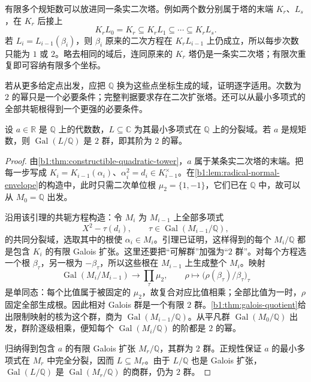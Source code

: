 有限多个规矩数可以放进同一条实二次塔。例如两个数分别属于塔的末端 \(K_r\)、\(L_s\)，在 \(K_r\) 后接上
\[
	K_rL_0=K_r\subseteq K_rL_1\subseteq\cdots\subseteq K_rL_s.
\]
若 \(L_i=L_{i-1}(\beta_i)\)，则 \(\beta_i\) 原来的二次方程在 \(K_rL_{i-1}\) 上仍成立，所以每步次数只能为 \(1\) 或 \(2\)。略去相同的域后，连同原来的 \(K_r\) 塔仍是一条实二次塔；有限次重复即可容纳有限多个坐标。

\ProseParagraphBreak
若从更多给定点出发，应把 \(\mathbb Q\) 换为这些点坐标生成的域，证明逐字适用。次数为 \(2\) 的幂只是一个必要条件；完整判据要求存在二次扩张塔。还可以从最小多项式的全部共轭根得到一个更强的必要条件。

\begin{proposition}\label{b1:prop:constructible-splitting-two-group}
	设 \(a\in\mathbb R\) 是 \(\mathbb Q\) 上的代数数，\(L\subseteq\mathbb C\) 为其最小多项式在 \(\mathbb Q\) 上的分裂域。若 \(a\) 是规矩数，则 \(\operatorname{Gal}(L/\mathbb Q)\) 是 \(2\) 群，即其阶为 \(2\) 的幂。
\end{proposition}
\begin{proof}
	由\cref{b1:thm:constructible-quadratic-tower}，\(a\) 属于某条实二次塔的末端。把每一步写成 \(K_i=K_{i-1}(\alpha_i)\)、\(\alpha_i^2=d_i\in K_{i-1}^\times\)。在\cref{b1:lem:radical-normal-envelope}的构造中，此时只需二次单位根 \(\mu_2=\{1,-1\}\)，它们已在 \(\mathbb Q\) 中，故可以从 \(M_0=\mathbb Q\) 出发。

	沿用该引理的共轭方程构造：令 \(M_i\) 为 \(M_{i-1}\) 上全部多项式
	\[
		X^2-\tau(d_i),\qquad \tau\in\operatorname{Gal}(M_{i-1}/\mathbb Q),
	\]
	的共同分裂域，选取其中的根使 \(\alpha_i\in M_i\)。引理已证明，这样得到的每个 \(M_i/\mathbb Q\) 都是包含 \(K_i\) 的有限 Galois 扩张。这里还要把“可解群”加强为“\(2\) 群”。对每个方程选一个根 \(\beta_\tau\)，另一根为 \(-\beta_\tau\)，所以这些根在 \(M_{i-1}\) 上生成整个 \(M_i\)。映射
	\[
		\operatorname{Gal}(M_i/M_{i-1})\longrightarrow\prod_\tau\mu_2, \qquad \rho\longmapsto \bigl(\rho(\beta_\tau)/\beta_\tau\bigr)_\tau
	\]
	是单同态：每个比值属于被固定的 \(\mu_2\)，故复合对应比值相乘；全部比值为一时，\(\rho\) 固定全部生成根。因此相对 Galois 群是一个有限 \(2\) 群。\cref{b1:thm:galois-quotient}给出限制映射的核为这个群，商为 \(\operatorname{Gal}(M_{i-1}/\mathbb Q)\)。从平凡群 \(\operatorname{Gal}(M_0/\mathbb Q)\) 出发，群阶逐级相乘，便知每个 \(\operatorname{Gal}(M_i/\mathbb Q)\) 的阶都是 \(2\) 的幂。

	归纳得到包含 \(a\) 的有限 Galois 扩张 \(M_r/\mathbb Q\)，其群为 \(2\) 群。正规性保证 \(a\) 的最小多项式在 \(M_r\) 中完全分裂，因而 \(L\subseteq M_r\)。由于 \(L/\mathbb Q\) 也是 Galois 扩张，\(\operatorname{Gal}(L/\mathbb Q)\) 是 \(\operatorname{Gal}(M_r/\mathbb Q)\) 的商群，仍为 \(2\) 群。
\end{proof}

